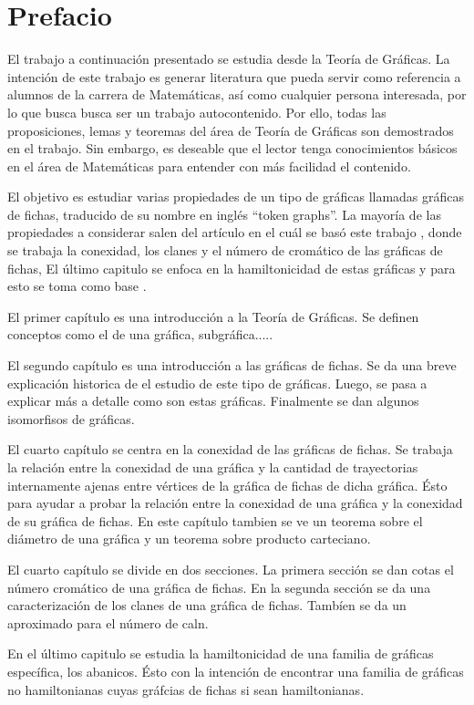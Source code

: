 \chapter{Prefacio}
\label{sec:prefacio}

El trabajo a continuaci\'on presentado se estudia desde la Teor\'ia de
Gr\'aficas. La intenci\'on de este trabajo es generar literatura que pueda
servir como referencia a alumnos de la carrera de Matem\'aticas, as\'i como
cualquier persona interesada, por lo que busca busca ser un trabajo
autocontenido. Por ello, todas las proposiciones, lemas y teoremas del \'area de
Teor\'ia de Gr\'aficas son demostrados en el trabajo. Sin embargo, es deseable
que el lector tenga conocimientos b\'asicos en el \'area de Matem\'aticas para
entender con m\'as facilidad el contenido. 

El objetivo es estudiar varias propiedades de un tipo de gr\'aficas llamadas
gr\'aficas de fichas, traducido de su nombre en ingl\'es ``token graphs''.
La mayor\'ia de las propiedades a considerar salen del art\'iculo en el cu\'al
se bas\'o este trabajo \cite{fabilaToken}, donde se trabaja la conexidad, los
clanes y el n\'umero de crom\'atico de las gr\'aficas de fichas, El \'ultimo
capitulo se enfoca en la hamiltonicidad de estas gr\'aficas y para esto se toma
como base \cite{adameHamilt}. 

El primer cap\'itulo es una introducci\'on a la Teor\'ia de Gr\'aficas. Se
definen conceptos como el de una gr\'afica, subgr\'afica.....

El segundo cap\'itulo es una introducci\'on a las gr\'aficas de fichas. Se da
una breve explicaci\'on historica de el estudio de este tipo de gr\'aficas.
Luego, se pasa a explicar m\'as a detalle como son estas gr\'aficas. Finalmente
se dan algunos isomorfisos de gr\'aficas.

El cuarto cap\'itulo se centra en la conexidad de las gr\'aficas de fichas. Se
trabaja la relaci\'on entre la conexidad de una gr\'afica y la cantidad de
trayectorias internamente ajenas entre v\'ertices de la gr\'afica de fichas de
dicha gr\'afica. \'Esto para ayudar a probar la relaci\'on entre la conexidad de
una gr\'afica y la conexidad de su gr\'afica de fichas. En este cap\'itulo
tambien se ve un teorema sobre el di\'ametro de una gr\'afica y un teorema sobre
producto carteciano.

El cuarto cap\'itulo se  divide en dos secciones. La primera secci\'on se dan
cotas el n\'umero crom\'atico de una gr\'afica de fichas. En la segunda
secci\'on se da una caracterizaci\'on de los clanes de una gr\'afica de fichas.
Tamb\'ien se da un aproximado para el n\'umero de caln.

En el \'ultimo capitulo se estudia la hamiltonicidad de una familia de
gr\'aficas espec\'ifica, los abanicos. \'Esto con la intenci\'on de encontrar
una familia de gr\'aficas no hamiltonianas cuyas gr\'afcias de fichas si sean
hamiltonianas.